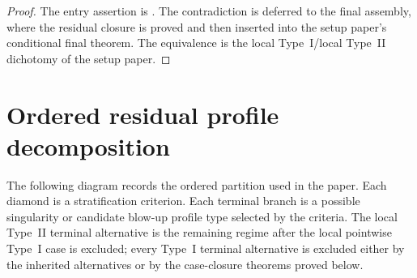 \documentclass[11pt]{amsart}
\numberwithin{equation}{section}
\theoremstyle{plain}
\theoremstyle{definition}
\theoremstyle{remark}
\begin{document}
\begin{proof}
The entry assertion is .  The
contradiction is deferred to the final assembly, where the residual closure is
proved and then inserted into the setup paper's conditional final theorem.  The
equivalence is the local Type~I/local Type~II dichotomy of the setup paper.
\end{proof}

\section{Ordered residual profile decomposition}
\label{sec:mermaid-decision-tree}

The following diagram records the ordered partition used in the
paper.  Each diamond is a stratification criterion.  Each terminal branch is a
possible singularity or candidate blow-up profile type selected by the criteria.
The local Type~II terminal alternative is the remaining regime after the local
pointwise Type~I case is excluded; every Type~I terminal alternative is
excluded either by the inherited alternatives or by the case-closure
theorems proved below.
\end{document}
